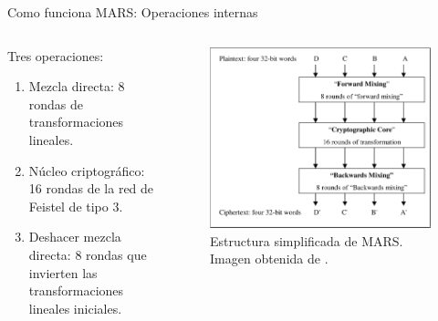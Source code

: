 \documentclass{beamer}
\begin{document}
\begin{frame}{Como funciona MARS: Operaciones internas}

	\begin{columns}[T]
		\begin{column}{.5\textwidth}
			Tres operaciones:

			\begin{enumerate}
				\item Mezcla directa: 8 rondas de transformaciones lineales.
				\item Núcleo criptográfico: 16 rondas de la red de Feistel de tipo 3.
				\item Deshacer mezcla directa: 8 rondas que invierten las transformaciones lineales iniciales.
			\end{enumerate}
		\end{column}
		\begin{column}{.5\textwidth}
			\begin{figure}[H]
				\centering
				\includegraphics[scale = 0.5]{MARS.png}
				\caption{Estructura simplificada de MARS. Imagen obtenida de \cite{propuestaMARS}.} \label{fig:MARS}
			\end{figure}
		\end{column}

	\end{columns}

\end{frame}
\end{document}
